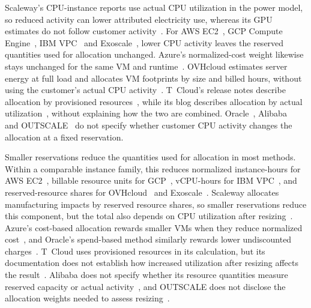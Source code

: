 Scaleway's CPU-instance reports use actual CPU utilization in the power model, so reduced activity can lower attributed electricity use, whereas its GPU estimates do not follow customer activity~\cite{scaleway-instances-footprint}.
For AWS EC2~\cite{aws-ccft-model3}, GCP Compute Engine~\cite{schneider-mattia-2024}, IBM VPC~\cite{ibm-carbon-calc-v3} and Exoscale~\cite{exoscale-impact-methodology}, lower CPU activity leaves the reserved quantities used for allocation unchanged.
Azure's normalized-cost weight likewise stays unchanged for the same VM and runtime~\cite{microsoft-s3-2021,azure-methodology-2026}.
OVHcloud estimates server energy at full load and allocates VM footprints by size and billed hours, without using the customer's actual CPU activity~\cite{ovh-eit-v2}.
T~Cloud's release notes describe allocation by provisioned resources~\cite{tcloud-sustainability-release}, while its blog describes allocation by actual utilization~\cite{tcloud-sustainability-dashboard}, without explaining how the two are combined.
Oracle~\cite{oracle-emissions-management}, Alibaba~\cite{alibaba-cloud-carbon-footprint} and OUTSCALE~\cite{outscale-carbon-methodology} do not specify whether customer CPU activity changes the allocation at a fixed reservation.

Smaller reservations reduce the quantities used for allocation in most methods.
Within a comparable instance family, this reduces normalized instance-hours for AWS EC2~\cite{aws-ccft-model3}, billable resource units for GCP~\cite{schneider-mattia-2024}, vCPU-hours for IBM VPC~\cite{ibm-carbon-calc-v3}, and reserved-resource shares for OVHcloud~\cite{ovh-eit-v2} and Exoscale~\cite{exoscale-impact-methodology}.
Scaleway allocates manufacturing impacts by reserved resource shares, so smaller reservations reduce this component, but the total also depends on CPU utilization after resizing~\cite{scaleway-instances-footprint}.
Azure's cost-based allocation rewards smaller VMs when they reduce normalized cost~\cite{microsoft-s3-2021}, and Oracle's spend-based method similarly rewards lower undiscounted charges~\cite{oracle-emissions-management}.
T~Cloud uses provisioned resources in its calculation, but its documentation does not establish how increased utilization after resizing affects the result~\cite{tcloud-sustainability-release,tcloud-sustainability-dashboard}.
Alibaba does not specify whether its resource quantities measure reserved capacity or actual activity~\cite{alibaba-cloud-carbon-footprint}, and OUTSCALE does not disclose the allocation weights needed to assess resizing~\cite{outscale-carbon-methodology}.


